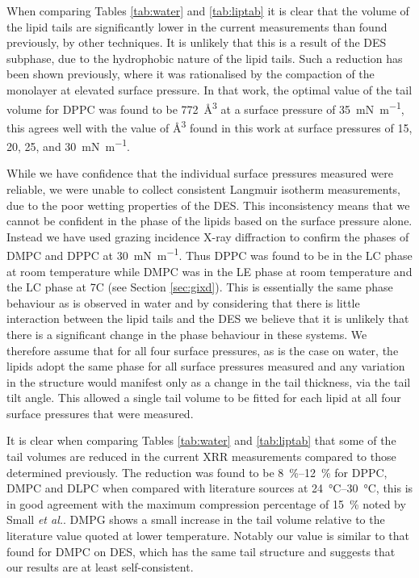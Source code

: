\documentclass[twocolumn,a4paper]{paper}
\begin{document}
When comparing Tables \ref{tab:water} and \ref{tab:liptab} it is clear that the volume of the lipid tails are significantly lower in the current measurements than found previously, by other techniques.
It is unlikely that this is a result of the DES subphase, due to the hydrophobic nature of the lipid tails.
Such a reduction has been shown previously\cite{Campbell2018}, where it was rationalised by the compaction of the monolayer at elevated surface pressure.
In that work, the optimal value of the tail volume for DPPC was found to be \SI{772}{\cubic\angstrom} at a surface pressure of \SI{35}{\milli\newton\per\meter}, this agrees well with the value of \si{\cubic\angstrom} found in this work at surface pressures of 15, 20, 25, and \SI{30}{\milli\newton\per\meter}.

While we have confidence that the individual surface pressures measured were reliable, we were unable to collect consistent Langmuir isotherm measurements, due to the poor wetting properties of the DES.
This inconsistency means that we cannot be confident in the phase of the lipids based on the surface pressure alone.
Instead we have used grazing incidence X-ray diffraction to confirm the phases of DMPC and DPPC at \SI{30}{\milli\newton\per\meter}.
Thus DPPC was found to be in the LC phase at room temperature while DMPC was in the LE phase at room temperature and the LC phase at 7C (see Section \ref{sec:gixd}).
This is essentially the same phase behaviour as is observed in water \cite{Phillips1968} and by considering that there is little interaction between the lipid tails and the DES we believe that it is unlikely that there is a significant change in the phase behaviour in these systems\cite{Nagle1976}.
We therefore assume that for all four surface pressures, as is the case on water, the lipids adopt the same phase for all surface pressures measured and any variation in the structure would manifest only as a change in the tail thickness, via the tail tilt angle.
This allowed a single tail volume to be fitted for each lipid at all four surface pressures that were measured.

It is clear when comparing Tables \ref{tab:water} and \ref{tab:liptab} that some of the tail volumes are reduced in the current XRR measurements compared to those determined previously.
The reduction was found to be \SIrange{8}{12}{\percent} for DPPC, DMPC and DLPC when compared with literature sources at \SIrange{24}{30}{\celsius}, this is in good agreement with the maximum compression percentage of \SI{15}{\percent} noted by Small \emph{et al.}\cite{Small1984}. DMPG shows a small increase in the tail volume relative to the literature value quoted at lower temperature.
Notably our value is similar to that found for DMPC on DES, which has the same tail structure and suggests that our results are at least self-consistent.
\end{document}
